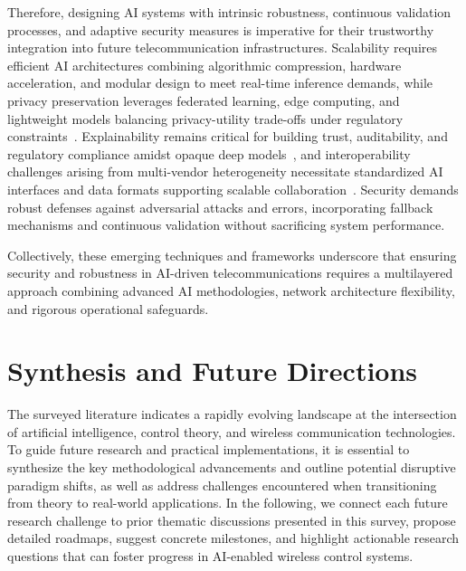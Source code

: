 \documentclass[sigconf]{acmart}
\begin{document}
Therefore, designing AI systems with intrinsic robustness, continuous validation processes, and adaptive security measures is imperative for their trustworthy integration into future telecommunication infrastructures. Scalability requires efficient AI architectures combining algorithmic compression, hardware acceleration, and modular design to meet real-time inference demands, while privacy preservation leverages federated learning, edge computing, and lightweight models balancing privacy-utility trade-offs under regulatory constraints~\cite{ref48,ref50}. Explainability remains critical for building trust, auditability, and regulatory compliance amidst opaque deep models~\cite{ref50}, and interoperability challenges arising from multi-vendor heterogeneity necessitate standardized AI interfaces and data formats supporting scalable collaboration~\cite{ref55}. Security demands robust defenses against adversarial attacks and errors, incorporating fallback mechanisms and continuous validation without sacrificing system performance.

Collectively, these emerging techniques and frameworks underscore that ensuring security and robustness in AI-driven telecommunications requires a multilayered approach combining advanced AI methodologies, network architecture flexibility, and rigorous operational safeguards.

\section{Synthesis and Future Directions}

The surveyed literature indicates a rapidly evolving landscape at the intersection of artificial intelligence, control theory, and wireless communication technologies. To guide future research and practical implementations, it is essential to synthesize the key methodological advancements and outline potential disruptive paradigm shifts, as well as address challenges encountered when transitioning from theory to real-world applications. In the following, we connect each future research challenge to prior thematic discussions presented in this survey, propose detailed roadmaps, suggest concrete milestones, and highlight actionable research questions that can foster progress in AI-enabled wireless control systems.
\end{document}
